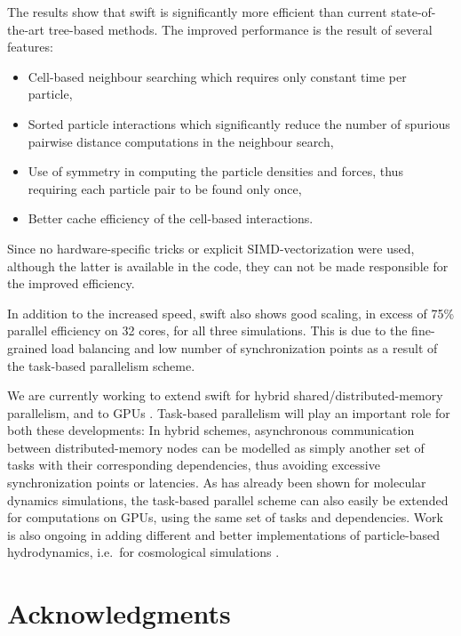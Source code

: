 \documentclass[a4paper,conference]{IEEEtran}
\newcommand{\swift}
    {{\sc swift}\xspace}
\begin{document}
The results show that \swift is significantly more efficient than
current state-of-the-art tree-based methods.
The improved performance is the result of several features:
%
\begin{itemize}
    \item Cell-based neighbour searching which requires only
        constant time per particle,
    \item Sorted particle interactions which significantly
        reduce the number of spurious pairwise distance
        computations in the neighbour search,
    \item Use of symmetry in computing the particle densities
        and forces, thus requiring each particle pair to be
        found only once,
    \item Better cache efficiency of the cell-based interactions.
\end{itemize}
%
Since no hardware-specific tricks or explicit
SIMD-vectorization were used, although the latter is available
in the code, they can not be made responsible for the
improved efficiency.

In addition to the increased speed, \swift
also shows good scaling, in excess
of 75\% parallel efficiency on 32 cores, for all three simulations.
This is due to the fine-grained load balancing and low number
of synchronization points as a result of the task-based parallelism scheme.

We are currently working to extend \swift for hybrid
shared/distributed-memory parallelism, and to GPUs
\cite{ref:Chalk2013}.
Task-based parallelism will play an important role for
both these developments: In hybrid schemes, asynchronous communication
between distributed-memory nodes can be modelled as simply another
set of tasks with their corresponding dependencies, thus avoiding
excessive synchronization points or latencies.
As has already been shown for molecular dynamics simulations,
the task-based parallel scheme can also easily be extended
for computations on GPUs, using the same set of tasks and 
dependencies.
Work is also ongoing in adding different and better implementations
of particle-based hydrodynamics, i.e.~for cosmological
simulations \cite{ref:Schaller2013}.


\section*{Acknowledgments}
\end{document}
